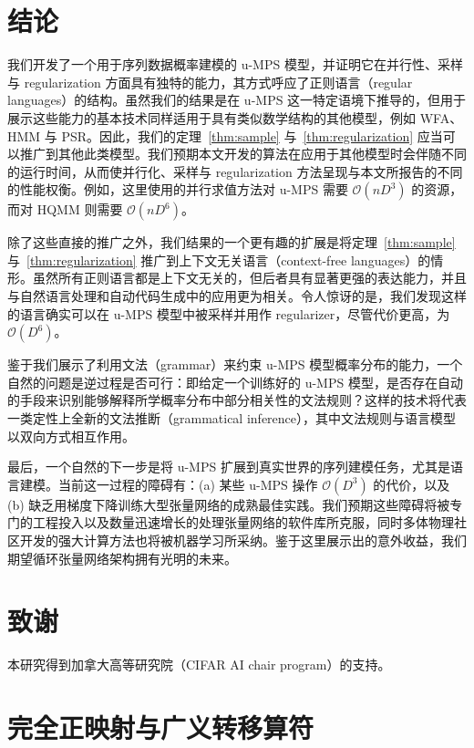 \documentclass[twoside]{article}
\newcommand{\bigO}{\mc{O}}
\newcommand{\mc}[1]{\mathcal{#1}}
\begin{document}
\section{结论}

我们开发了一个用于序列数据概率建模的 u-MPS 模型，并证明它在并行性、采样与 regularization 方面具有独特的能力，其方式呼应了正则语言（regular languages）的结构。虽然我们的结果是在 u-MPS 这一特定语境下推导的，但用于展示这些能力的基本技术同样适用于具有类似数学结构的其他模型，例如 WFA、HMM 与 PSR。因此，我们的定理~\ref{thm:sample} 与~\ref{thm:regularization} 应当可以推广到其他此类模型。我们预期本文开发的算法在应用于其他模型时会伴随不同的运行时间，从而使并行化、采样与 regularization 方法呈现与本文所报告的不同的性能权衡。例如，这里使用的并行求值方法对 u-MPS 需要 $\bigO(n D^3)$ 的资源，而对 HQMM 则需要 $\bigO(n D^6)$。

除了这些直接的推广之外，我们结果的一个更有趣的扩展是将定理~\ref{thm:sample} 与~\ref{thm:regularization} 推广到上下文无关语言（context-free languages）的情形。虽然所有正则语言都是上下文无关的，但后者具有显著更强的表达能力，并且与自然语言处理和自动代码生成中的应用更为相关。令人惊讶的是，我们发现这样的语言确实可以在 u-MPS 模型中被采样并用作 regularizer，尽管代价更高，为 $\bigO(D^6)$。

鉴于我们展示了利用文法（grammar）来约束 u-MPS 模型概率分布的能力，一个自然的问题是逆过程是否可行：即给定一个训练好的 u-MPS 模型，是否存在自动的手段来识别能够解释所学概率分布中部分相关性的文法规则？这样的技术将代表一类定性上全新的文法推断（grammatical inference），其中文法规则与语言模型以双向方式相互作用。

最后，一个自然的下一步是将 u-MPS 扩展到真实世界的序列建模任务，尤其是语言建模。当前这一过程的障碍有：(a) 某些 u-MPS 操作 $\bigO(D^3)$ 的代价，以及 (b) 缺乏用梯度下降训练大型张量网络的成熟最佳实践。我们预期这些障碍将被专门的工程投入以及数量迅速增长的处理张量网络的软件库所克服，同时多体物理社区开发的强大计算方法也将被机器学习所采纳。鉴于这里展示出的意外收益，我们期望循环张量网络架构拥有光明的未来。

\section*{致谢}
本研究得到加拿大高等研究院（CIFAR AI chair program）的支持。

\appendix
\onecolumn

\section{完全正映射与广义转移算符}
\label{sec:appendix_a}
\end{document}
